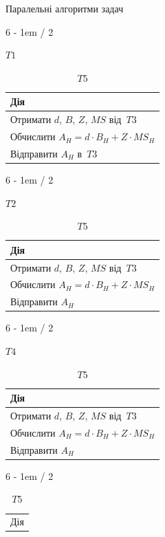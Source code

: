 \documentclass[
  a4paper,
  oneside,
  BCOR = 10mm,
  DIV = 12,
  12pt,
  headings = normal,
]{scrartcl}
\newlength{\gridunitwidth}
\begin{document}
			\begin{table}[!htbp]
				\caption{Паралельні алгоритми задач}
				\label{tab:parallel-algos}
				\begin{subtable}[b]{6 \gridunitwidth - 1em / 2}
					\caption{$T1$}
					\begin{tabular}{
						v{\columnwidth - 2\tabcolsep}
					}
						\toprule
							Дія\\
						\midrule
							Отримати $d$, $B$, $Z$, $MS$ від~$T3$\\
							Обчислити $A_{H} = d \cdot B_{H} + Z \cdot MS_{H}$\\
							Відправити $A_{H}$ в~$T3$\\
						\bottomrule
					\end{tabular}
				\end{subtable}%
				\hspace{1em}
				\begin{subtable}[b]{6 \gridunitwidth - 1em / 2}
					\caption{$T2$}
					\begin{tabular}{
						v{\columnwidth - 2\tabcolsep}
					}
						\toprule
							Дія\\
						\midrule
							Отримати $d$, $B$, $Z$, $MS$ від~$T3$\\
							Обчислити $A_{H} = d \cdot B_{H} + Z \cdot MS_{H}$\\
							Відправити $A_{H}$\\
						\bottomrule
					\end{tabular}
				\end{subtable}
				\begin{subtable}[b]{6 \gridunitwidth - 1em / 2}
					\caption{$T4$}
					\begin{tabular}{
						v{\columnwidth - 2\tabcolsep}
					}
						\toprule
							Дія\\
						\midrule
						Отримати $d$, $B$, $Z$, $MS$ від~$T3$\\
						Обчислити $A_{H} = d \cdot B_{H} + Z \cdot MS_{H}$\\
						Відправити $A_{H}$\\
						\bottomrule
					\end{tabular}
				\end{subtable}%
				\hspace{1em}
				\begin{subtable}[b]{6 \gridunitwidth - 1em / 2}
					\caption{$T5$}
					\begin{tabular}{
						v{\columnwidth - 2\tabcolsep}
					}
						\toprule
							Дія\\

\end{tabular}
\end{subtable}
\end{table}
\end{document}
